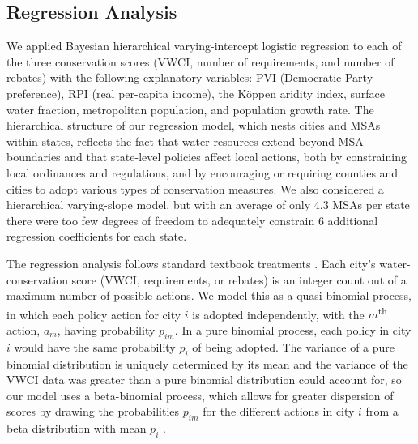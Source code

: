 \documentclass[draft,linenumbers]{agujournal}\usepackage{knitr}
\begin{document}
\subsection{Regression Analysis}
We applied Bayesian hierarchical varying-intercept
logistic regression to each of the
three conservation scores (VWCI, number of requirements, and number of rebates)
with the following explanatory variables:
PVI (Democratic Party preference), RPI (real per-capita income),
the K\"oppen aridity index, surface water fraction,
metropolitan population, and population growth rate.
The hierarchical structure of our regression model, which nests cities and MSAs
within states, reflects the fact that water resources extend beyond MSA
boundaries and that state-level policies affect local actions, both by
constraining local ordinances and regulations, and by encouraging or requiring
counties and cities to adopt various types of conservation measures.
We also considered a hierarchical varying-slope model, but with an average
of only 4.3 MSAs per state there were too few degrees of freedom to adequately
constrain 6 additional regression coefficients for each state.

The regression analysis follows standard textbook treatments
\citep{gelman:arm:2007,gelman:bda:2014}.
Each city's water-conservation score (VWCI, requirements, or rebates) is
an integer count out of a maximum number of possible actions.
We model this as a quasi-binomial process, in which each policy action
for city $i$ is adopted independently, with
the $m$\textsuperscript{th} action, $a_m$, having probability
$p_{im}$.
In a pure binomial process, each policy in city $i$ would have the same
probability $p_i$ of being adopted.
The variance of a pure binomial distribution is uniquely determined
by its mean and the variance of the VWCI data was
greater than a pure binomial
distribution could account for,
so our model uses a beta-binomial process, which allows for greater dispersion
of scores by drawing the probabilities $p_{im}$
for the different actions in city $i$ from a beta distribution with mean $p_i$
\citep[pp.~437--38]{gelman:bda:2014}.
\end{document}

